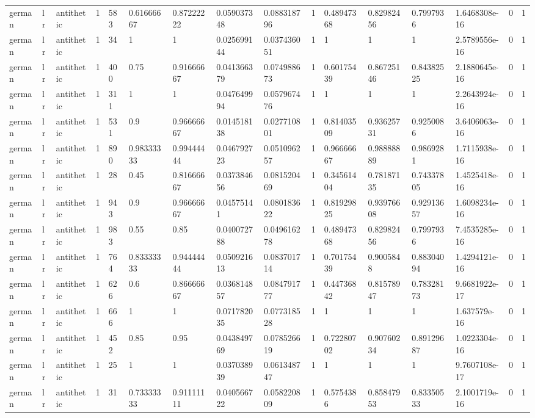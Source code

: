 \begin{tabular}{llllllllllllllll}
german & lr & antithetic & 1 & 583 & 0.61666667 & 0.87222222 & 0.059037348 & 0.088318796 & 1 & 0.48947368 & 0.82982456 & 0.7997936 & 1.6468308e-16 & 0 & 1 \\
german & lr & antithetic & 1 & 34 & 1 & 1 & 0.025699144 & 0.037436051 & 1 & 1 & 1 & 1 & 2.5789556e-16 & 0 & 1 \\
german & lr & antithetic & 1 & 400 & 0.75 & 0.91666667 & 0.041366379 & 0.074988673 & 1 & 0.60175439 & 0.86725146 & 0.84382525 & 2.1880645e-16 & 0 & 1 \\
german & lr & antithetic & 1 & 311 & 1 & 1 & 0.047649994 & 0.057967476 & 1 & 1 & 1 & 1 & 2.2643924e-16 & 0 & 1 \\
german & lr & antithetic & 1 & 531 & 0.9 & 0.96666667 & 0.014518138 & 0.027710801 & 1 & 0.81403509 & 0.93625731 & 0.9250086 & 3.6406063e-16 & 0 & 1 \\
german & lr & antithetic & 1 & 890 & 0.98333333 & 0.99444444 & 0.046792723 & 0.051096257 & 1 & 0.96666667 & 0.98888889 & 0.9869281 & 1.7115938e-16 & 0 & 1 \\
german & lr & antithetic & 1 & 28 & 0.45 & 0.81666667 & 0.037384656 & 0.081520469 & 1 & 0.34561404 & 0.78187135 & 0.74337805 & 1.4525418e-16 & 0 & 1 \\
german & lr & antithetic & 1 & 943 & 0.9 & 0.96666667 & 0.04575141 & 0.080183622 & 1 & 0.81929825 & 0.93976608 & 0.92913657 & 1.6098234e-16 & 0 & 1 \\
german & lr & antithetic & 1 & 983 & 0.55 & 0.85 & 0.040072788 & 0.049616278 & 1 & 0.48947368 & 0.82982456 & 0.7997936 & 7.4535285e-16 & 0 & 1 \\
german & lr & antithetic & 1 & 764 & 0.83333333 & 0.94444444 & 0.050921613 & 0.083701714 & 1 & 0.70175439 & 0.9005848 & 0.88304094 & 1.4294121e-16 & 0 & 1 \\
german & lr & antithetic & 1 & 626 & 0.6 & 0.86666667 & 0.036814857 & 0.084791777 & 1 & 0.44736842 & 0.81578947 & 0.78328173 & 9.6681922e-17 & 0 & 1 \\
german & lr & antithetic & 1 & 666 & 1 & 1 & 0.071782035 & 0.077318528 & 1 & 1 & 1 & 1 & 1.637579e-16 & 0 & 1 \\
german & lr & antithetic & 1 & 452 & 0.85 & 0.95 & 0.043849769 & 0.078526619 & 1 & 0.72280702 & 0.90760234 & 0.89129687 & 1.0223304e-16 & 0 & 1 \\
german & lr & antithetic & 1 & 25 & 1 & 1 & 0.037038939 & 0.061348747 & 1 & 1 & 1 & 1 & 9.7607108e-17 & 0 & 1 \\
german & lr & antithetic & 1 & 31 & 0.73333333 & 0.91111111 & 0.040566722 & 0.058220809 & 1 & 0.5754386 & 0.85847953 & 0.83350533 & 2.1001719e-16 & 0 & 1 \\

\end{tabular}
